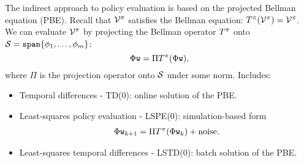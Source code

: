 The indirect approach to policy evaluation is based on the projected Bellman equation (PBE). Recall that $\mathcal{V}^\pi$ satisfies the Bellman equation: $T^\pi(\mathcal{V}^\pi) = \mathcal{V}^\pi$. We can evaluate $\mathcal{V}^\pi$ by projecting the Bellman operator $T^\pi$ onto $\mathcal{S}=\texttt{span}\{\phi_{1},\dots,\phi_{m}\}$:
\begin{equation*}
    \Phi \texttt{w} = \Pi T^\pi(\Phi \texttt{w}),
\end{equation*}
where $\Pi$ is the projection operator onto $\mathcal{S}$ under some norm.
Includes:
\begin{itemize}
\item Temporal differences - TD(0): online solution of the PBE.
\item Least-squares policy evaluation - LSPE(0): simulation-based form
\begin{align*}\Phi \texttt{w}_{k+1} = \Pi T^\pi(\Phi \texttt{w}_k) + \mathrm{noise}.\end{align*} 
\item Least-squares temporal differences - LSTD(0): batch solution of the PBE.
\end{itemize}

